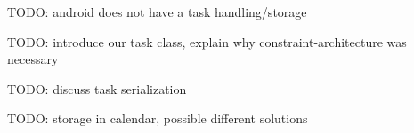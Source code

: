 TODO: android does not have a task handling/storage

TODO: introduce our task class, explain why constraint-architecture was necessary 

TODO: discuss task serialization 

TODO: storage in calendar, possible different solutions